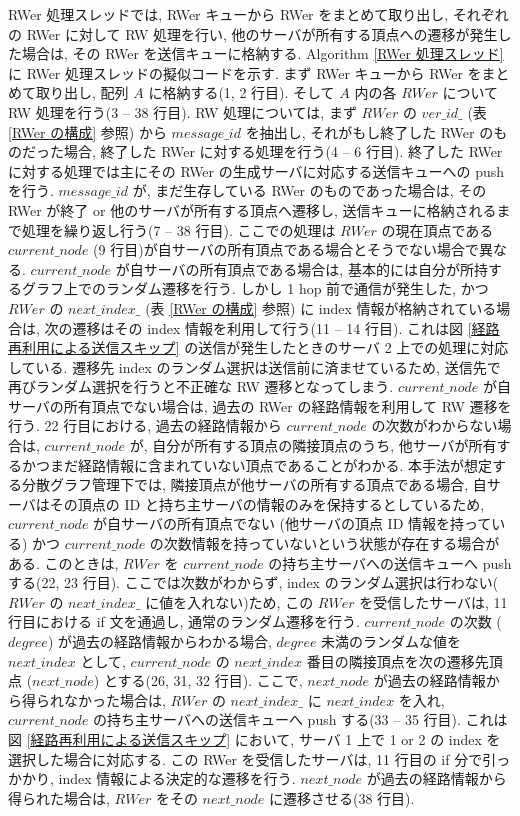 RWer 処理スレッドでは, RWer キューから RWer をまとめて取り出し, それぞれの RWer に対して RW 処理を行い, 他のサーバが所有する頂点への遷移が発生した場合は, その RWer を送信キューに格納する. Algorithm \ref{RWer 処理スレッド} に RWer 処理スレッドの擬似コードを示す. まず RWer キューから RWer をまとめて取り出し, 配列 $A$ に格納する(1, 2 行目). そして $A$ 内の各 $RWer$ について RW 処理を行う(3 -- 38 行目). RW 処理については, まず $RWer$ の $ver\_id\_$ (表 \ref{RWer の構成} 参照) から $message\_id$ を抽出し, それがもし終了した RWer のものだった場合, 終了した RWer に対する処理を行う(4 -- 6 行目). 終了した RWer に対する処理では主にその RWer の生成サーバに対応する送信キューへの push を行う. $message\_id$ が, まだ生存している RWer のものであった場合は, その RWer が終了 or 他のサーバが所有する頂点へ遷移し, 送信キューに格納されるまで処理を繰り返し行う(7 -- 38 行目). ここでの処理は $RWer$ の現在頂点である $current\_node$ (9 行目)が自サーバの所有頂点である場合とそうでない場合で異なる. $current\_node$ が自サーバの所有頂点である場合は, 基本的には自分が所持するグラフ上でのランダム遷移を行う. しかし 1 hop 前で通信が発生した, かつ $RWer$ の $next\_index\_$ (表 \ref{RWer の構成} 参照) に index 情報が格納されている場合は, 次の遷移はその index 情報を利用して行う(11 -- 14 行目). これは図 \ref{経路再利用による送信スキップ} の送信が発生したときのサーバ 2 上での処理に対応している. 遷移先 index のランダム選択は送信前に済ませているため, 送信先で再びランダム選択を行うと不正確な RW 遷移となってしまう. $current\_node$ が自サーバの所有頂点でない場合は, 過去の RWer の経路情報を利用して RW 遷移を行う. 22 行目における, 過去の経路情報から $current\_node$ の次数がわからない場合は, $current\_node$ が, 自分が所有する頂点の隣接頂点のうち, 他サーバが所有するかつまだ経路情報に含まれていない頂点であることがわかる. 本手法が想定する分散グラフ管理下では, 隣接頂点が他サーバの所有する頂点である場合, 自サーバはその頂点の ID と持ち主サーバの情報のみを保持するとしているため, $current\_node$ が自サーバの所有頂点でない (他サーバの頂点 ID 情報を持っている) かつ $current\_node$ の次数情報を持っていないという状態が存在する場合がある. このときは, $RWer$ を $current\_node$ の持ち主サーバへの送信キューへ push する(22, 23 行目). ここでは次数がわからず, index のランダム選択は行わない($RWer$ の $next\_index\_$ に値を入れない)ため, この $RWer$ を受信したサーバは, 11 行目における if 文を通過し, 通常のランダム遷移を行う. $current\_node$ の次数 ($degree$) が過去の経路情報からわかる場合, $degree$ 未満のランダムな値を $next\_index$ として, $current\_node$ の $next\_index$ 番目の隣接頂点を次の遷移先頂点 ($next\_node$) とする(26, 31, 32 行目). ここで, $next\_node$ が過去の経路情報から得られなかった場合は, $RWer$ の $next\_index\_$ に $next\_index$ を入れ, $current\_node$ の持ち主サーバへの送信キューへ push する(33 -- 35 行目). これは図 \ref{経路再利用による送信スキップ} において, サーバ 1 上で 1 or 2 の index を選択した場合に対応する. この RWer を受信したサーバは, 11 行目の if 分で引っかかり, index 情報による決定的な遷移を行う. $next\_node$ が過去の経路情報から得られた場合は, $RWer$ をその $next\_node$ に遷移させる(38 行目). 
\\
\\
\\
\\

